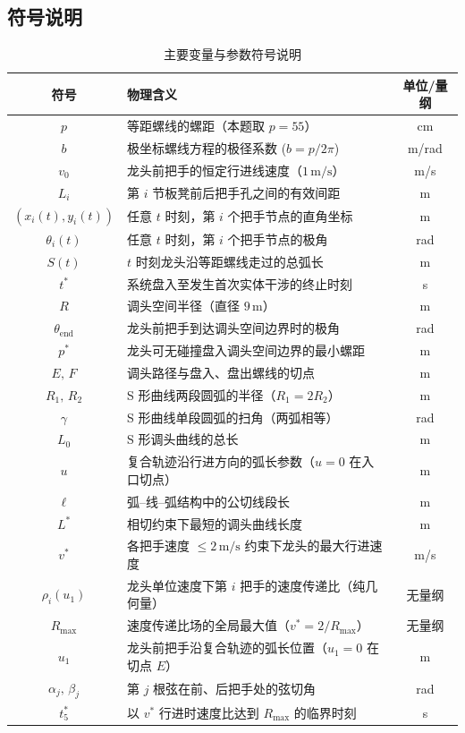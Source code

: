 ﻿\documentclass{cumcmthesis}
\begin{document}
\subsection{符号说明}
\renewcommand{\arraystretch}{1.2}
\begin{table}[H]
\centering
\caption{主要变量与参数符号说明}
\begin{tabular}{clc}
\toprule
符号 & 物理含义 & 单位/量纲 \\
\midrule
$p$ & 等距螺线的螺距（本题取 $p=55$） & cm \\
$b$ & 极坐标螺线方程的极径系数 ($b = p / 2\pi$) & m/rad \\
$v_{0}$ & 龙头前把手的恒定行进线速度（$1\,\text{m/s}$） & m/s \\
$L_i$ & 第 $i$ 节板凳前后把手孔之间的有效间距 & m \\
$(x_i(t), y_i(t))$ & 任意 $t$ 时刻，第 $i$ 个把手节点的直角坐标 & m \\
$\theta_i(t)$ & 任意 $t$ 时刻，第 $i$ 个把手节点的极角 & rad \\
$S(t)$ & $t$ 时刻龙头沿等距螺线走过的总弧长 & m \\
$t^*$ & 系统盘入至发生首次实体干涉的终止时刻 & s \\
$R$ & 调头空间半径（直径 $9\,\text{m}$） & m \\
$\theta_{\mathrm{end}}$ & 龙头前把手到达调头空间边界时的极角 & rad \\
$p^{*}$ & 龙头可无碰撞盘入调头空间边界的最小螺距 & m \\
\midrule
$E,\,F$ & 调头路径与盘入、盘出螺线的切点 & m \\
$R_1,\,R_2$ & S 形曲线两段圆弧的半径（$R_1=2R_2$） & m \\
$\gamma$ & S 形曲线单段圆弧的扫角（两弧相等） & rad \\
$L_0$ & S 形调头曲线的总长 & m \\
$u$ & 复合轨迹沿行进方向的弧长参数（$u=0$ 在入口切点） & m \\
$\ell$ & 弧–线–弧结构中的公切线段长 & m \\
$L^{*}$ & 相切约束下最短的调头曲线长度 & m \\
\midrule
$v^{*}$ & 各把手速度 $\le 2\,\text{m/s}$ 约束下龙头的最大行进速度 & m/s \\
$\rho_i(u_1)$ & 龙头单位速度下第 $i$ 把手的速度传递比（纯几何量） & 无量纲 \\
$R_{\max}$ & 速度传递比场的全局最大值（$v^{*}=2/R_{\max}$） & 无量纲 \\
$u_1$ & 龙头前把手沿复合轨迹的弧长位置（$u_1=0$ 在切点 $E$） & m \\
$\alpha_j,\,\beta_j$ & 第 $j$ 根弦在前、后把手处的弦切角 & rad \\
$t^{*}_{5}$ & 以 $v^{*}$ 行进时速度比达到 $R_{\max}$ 的临界时刻 & s \\
\bottomrule
\end{tabular}
\end{table}
\renewcommand{\arraystretch}{1.0}
\end{document}
